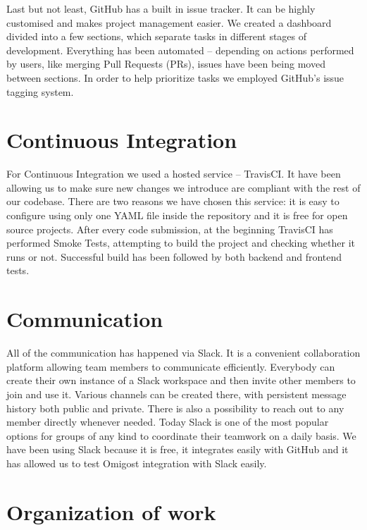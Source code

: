 \documentclass[licencjacka,en]{thesisclass}
\begin{document}
    Last but not least, GitHub has a built in issue tracker.
    It can be highly customised and makes project management easier.
    We created a dashboard divided into a few sections, which separate tasks
    in different stages of development.
    Everything has been automated -- depending on actions performed by users,
    like merging Pull Requests (PRs), issues have been being moved between sections.
    In order to help prioritize tasks we employed GitHub's issue tagging system.

    \section{Continuous Integration}

    For Continuous Integration we used a hosted service -- TravisCI.
    It have been allowing us to make sure new changes we introduce
    are compliant with the rest of our codebase.
    There are two reasons we have chosen this service:
    it is easy to configure using only one YAML file
    inside the repository and it is free for open source projects.
    After every code submission, at the beginning TravisCI
    has performed Smoke Tests, attempting to build the project
    and checking whether it runs or not.
    Successful build has been followed by both backend and frontend tests.

    \section{Communication}

    All of the communication has happened via Slack.
    It is a convenient collaboration platform allowing team members
    to communicate efficiently.
    Everybody can create their own instance of a Slack workspace and then
    invite other members to join and use it.
    Various channels can be created there,
    with persistent message history both public and private.
    There is also a possibility to reach out to any member directly whenever needed.
    Today Slack is one of the most popular options for groups of any kind to coordinate
    their teamwork on a daily basis.
    We have been using Slack because it is free, it integrates easily with GitHub
    and it has allowed us to test Omigost integration with Slack easily.

    \section{Organization of work}
\end{document}
